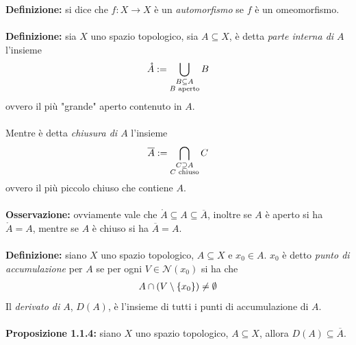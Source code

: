 \documentclass{article}
\begin{document}
\textbf{Definizione:} si dice che $f : X \longrightarrow X$ è un \textit{automorfismo} se $f$ è un omeomorfismo. \\ \\
\textbf{Definizione:} sia $X$ uno spazio topologico, sia $A \subseteq X$, è detta \textit{parte interna di $A$} l'insieme
\begin{gather}
    \mathring{A} := \bigcup_{\substack{B \subseteq A \\ B \text{ aperto}}} B \notag
\end{gather}
ovvero il più "grande" aperto contenuto in $A$. \\ \\
Mentre è detta \textit{chiusura di $A$} l'insieme
\begin{gather}
    \overline{A} := \bigcap_{\substack{C \supseteq A \\ C \text{ chiuso}}} C \notag
\end{gather}
ovvero il più piccolo chiuso che contiene $A$. \\ \\
\textbf{Osservazione:} ovviamente vale che $\mathring{A} \subseteq A \subseteq \overline{A}$, inoltre se $A$ è aperto si ha $\mathring{A} = A$, mentre se $A$ è chiuso si ha $\overline{A} = A$. \\ \\
\textbf{Definizione:} siano $X$ uno spazio topologico, $A \subseteq X$ e $x_0 \in A$. $x_0$ è detto \textit{punto di accumulazione} per $A$ se per ogni $V \in \mathcal{N}(x_0)$ si ha che
\begin{gather}
    A \cap (V \setminus \{ x_0 \}) \neq \emptyset \notag
\end{gather}
Il \textit{derivato di $A$}, $D(A)$, è l'insieme di tutti i punti di accumulazione di $A$. \\ \\
\textbf{Proposizione 1.1.4:} siano $X$ uno spazio topologico, $A \subseteq X$, allora $D(A) \subseteq \overline{A}$. \\
\end{document}

